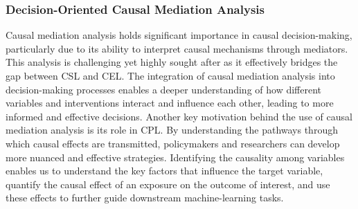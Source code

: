  



\subsubsection{Decision-Oriented Causal Mediation Analysis}\label{sec:med_dag} %


Causal mediation analysis holds significant importance in causal decision-making, particularly due to its ability to interpret causal mechanisms through mediators. This analysis is challenging yet highly sought after as it effectively bridges the gap between \acrshort{CSL} and \acrshort{CEL}. The integration of causal mediation analysis into decision-making processes enables a deeper understanding of how different variables and interventions interact and influence each other, leading to more informed and effective decisions. Another key motivation behind the use of causal mediation analysis is its role in \acrshort{CPL}. By understanding the pathways through which causal effects are transmitted, policymakers and researchers can develop more nuanced and effective strategies.
Identifying the causality among variables enables us to understand the key factors that influence the target variable, quantify the causal effect of an exposure on the outcome of interest, and use these effects to further guide downstream machine-learning tasks. %



